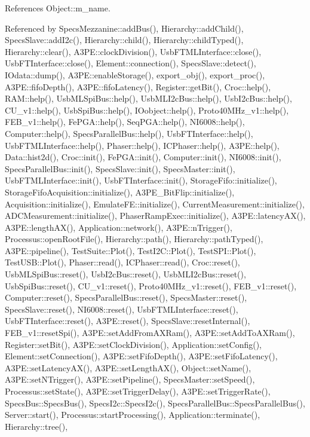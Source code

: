 References Object\+::m\+\_\+name.



Referenced by Specs\+Mezzanine\+::add\+Bus(), Hierarchy\+::add\+Child(), Specs\+Slave\+::add\+I2c(), Hierarchy\+::child(), Hierarchy\+::child\+Typed(), Hierarchy\+::clear(), A3\+P\+E\+::clock\+Division(), Usb\+F\+T\+M\+L\+Interface\+::close(), Usb\+F\+T\+Interface\+::close(), Element\+::connection(), Specs\+Slave\+::detect(), I\+Odata\+::dump(), A3\+P\+E\+::enable\+Storage(), export\+\_\+obj(), export\+\_\+proc(), A3\+P\+E\+::fifo\+Depth(), A3\+P\+E\+::fifo\+Latency(), Register\+::get\+Bit(), Croc\+::help(), R\+A\+M\+::help(), Usb\+M\+L\+Spi\+Bus\+::help(), Usb\+M\+L\+I2c\+Bus\+::help(), Usb\+I2c\+Bus\+::help(), C\+U\+\_\+v1\+::help(), Usb\+Spi\+Bus\+::help(), I\+Oobject\+::help(), Proto40\+M\+Hz\+\_\+v1\+::help(), F\+E\+B\+\_\+v1\+::help(), Fe\+P\+G\+A\+::help(), Seq\+P\+G\+A\+::help(), N\+I6008\+::help(), Computer\+::help(), Specs\+Parallel\+Bus\+::help(), Usb\+F\+T\+Interface\+::help(), Usb\+F\+T\+M\+L\+Interface\+::help(), Phaser\+::help(), I\+C\+Phaser\+::help(), A3\+P\+E\+::help(), Data\+::hist2d(), Croc\+::init(), Fe\+P\+G\+A\+::init(), Computer\+::init(), N\+I6008\+::init(), Specs\+Parallel\+Bus\+::init(), Specs\+Slave\+::init(), Specs\+Master\+::init(), Usb\+F\+T\+M\+L\+Interface\+::init(), Usb\+F\+T\+Interface\+::init(), Storage\+Fifo\+::initialize(), Storage\+Fifo\+Acquisition\+::initialize(), A3\+P\+E\+\_\+\+Bit\+Flip\+::initialize(), Acquisition\+::initialize(), Emulate\+F\+E\+::initialize(), Current\+Measurement\+::initialize(), A\+D\+C\+Measurement\+::initialize(), Phaser\+Ramp\+Exec\+::initialize(), A3\+P\+E\+::latency\+A\+X(), A3\+P\+E\+::length\+A\+X(), Application\+::network(), A3\+P\+E\+::n\+Trigger(), Processus\+::open\+Root\+File(), Hierarchy\+::path(), Hierarchy\+::path\+Typed(), A3\+P\+E\+::pipeline(), Test\+Suite\+::\+Plot(), Test\+I2\+C\+::\+Plot(), Test\+S\+P\+I\+::\+Plot(), Test\+U\+S\+B\+::\+Plot(), Phaser\+::read(), I\+C\+Phaser\+::read(), Croc\+::reset(), Usb\+M\+L\+Spi\+Bus\+::reset(), Usb\+I2c\+Bus\+::reset(), Usb\+M\+L\+I2c\+Bus\+::reset(), Usb\+Spi\+Bus\+::reset(), C\+U\+\_\+v1\+::reset(), Proto40\+M\+Hz\+\_\+v1\+::reset(), F\+E\+B\+\_\+v1\+::reset(), Computer\+::reset(), Specs\+Parallel\+Bus\+::reset(), Specs\+Master\+::reset(), Specs\+Slave\+::reset(), N\+I6008\+::reset(), Usb\+F\+T\+M\+L\+Interface\+::reset(), Usb\+F\+T\+Interface\+::reset(), A3\+P\+E\+::reset(), Specs\+Slave\+::reset\+Internal(), F\+E\+B\+\_\+v1\+::reset\+Spi(), A3\+P\+E\+::set\+Add\+From\+A\+X\+Ram(), A3\+P\+E\+::set\+Add\+To\+A\+X\+Ram(), Register\+::set\+Bit(), A3\+P\+E\+::set\+Clock\+Division(), Application\+::set\+Config(), Element\+::set\+Connection(), A3\+P\+E\+::set\+Fifo\+Depth(), A3\+P\+E\+::set\+Fifo\+Latency(), A3\+P\+E\+::set\+Latency\+A\+X(), A3\+P\+E\+::set\+Length\+A\+X(), Object\+::set\+Name(), A3\+P\+E\+::set\+N\+Trigger(), A3\+P\+E\+::set\+Pipeline(), Specs\+Master\+::set\+Speed(), Processus\+::set\+State(), A3\+P\+E\+::set\+Trigger\+Delay(), A3\+P\+E\+::set\+Trigger\+Rate(), Specs\+Bus\+::\+Specs\+Bus(), Specs\+I2c\+::\+Specs\+I2c(), Specs\+Parallel\+Bus\+::\+Specs\+Parallel\+Bus(), Server\+::start(), Processus\+::start\+Processing(), Application\+::terminate(), Hierarchy\+::tree(), 